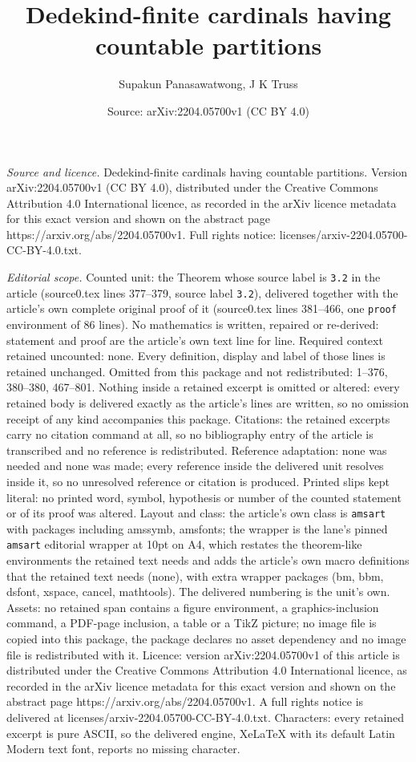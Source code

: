 \documentclass[10pt,a4paper]{amsart}
\title[Dedekind-finite cardinals having countable partitions]{Dedekind-finite cardinals having countable partitions}
\author{Supakun Panasawatwong, J K Truss}
\date{Source: arXiv:2204.05700v1 (CC BY 4.0)}
\begin{document}
\maketitle

\noindent\emph{Source and licence.} Dedekind-finite cardinals having countable partitions. Version arXiv:2204.05700v1 (CC BY 4.0), distributed under the Creative Commons Attribution 4.0 International licence, as recorded in the arXiv licence metadata for this exact version and shown on the abstract page https://arxiv.org/abs/2204.05700v1. Full rights notice: licenses/arxiv-2204.05700-CC-BY-4.0.txt.\par\smallskip

\noindent\textit{Editorial scope.} Counted unit: the Theorem whose source label is \texttt{3.2} in the article (source0.tex lines 377--379, source label \texttt{3.2}), delivered together with the article's own complete original proof of it (source0.tex lines 381--466, one \texttt{proof} environment of 86 lines). No mathematics is written, repaired or re-derived: statement and proof are the article's own text line for line. Required context retained uncounted: none. Every definition, display and label of those lines is retained unchanged. Omitted from this package and not redistributed: 1--376, 380--380, 467--801. Nothing inside a retained excerpt is omitted or altered: every retained body is delivered exactly as the article's lines are written, so no omission receipt of any kind accompanies this package. Citations: the retained excerpts carry no citation command at all, so no bibliography entry of the article is transcribed and no reference is redistributed. Reference adaptation: none was needed and none was made; every reference inside the delivered unit resolves inside it, so no unresolved reference or citation is produced. Printed slips kept literal: no printed word, symbol, hypothesis or number of the counted statement or of its proof was altered. Layout and class: the article's own class is \texttt{amsart} with packages including amssymb, amsfonts; the wrapper is the lane's pinned \texttt{amsart} editorial wrapper at 10pt on A4, which restates the theorem-like environments the retained text needs and adds the article's own macro definitions that the retained text needs (none), with extra wrapper packages (bm, bbm, dsfont, xspace, cancel, mathtools). The delivered numbering is the unit's own. Assets: no retained span contains a figure environment, a graphics-inclusion command, a PDF-page inclusion, a table or a TikZ picture; no image file is copied into this package, the package declares no asset dependency and no image file is redistributed with it. Licence: version arXiv:2204.05700v1 of this article is distributed under the Creative Commons Attribution 4.0 International licence, as recorded in the arXiv licence metadata for this exact version and shown on the abstract page https://arxiv.org/abs/2204.05700v1. A full rights notice is delivered at licenses/arxiv-2204.05700-CC-BY-4.0.txt. Characters: every retained excerpt is pure ASCII, so the delivered engine, XeLaTeX with its default Latin Modern text font, reports no missing character.
\end{document}
